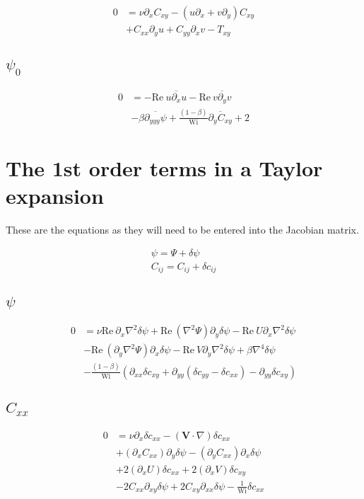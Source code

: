 \documentclass[12,a4paper]{article}
\newcommand{\dd}[1]{\partial_{#1}}
\newcommand{\lpl}{\nabla^{2}}
\newcommand{\bih}{\nabla^{4}}
\newcommand{\scij}{\delta c_{ij}}
\newcommand{\scxx}{\delta c_{xx}}
\newcommand{\scyy}{\delta c_{yy}}
\newcommand{\scxy}{\delta c_{xy}}
\newcommand{\spsi}{\delta \psi}
\newcommand{\Wi}{\mathrm{Wi}}
\newcommand{\Rey}{\mathrm{Re \ }}
\begin{document}
\begin{align}
    0 &= \nu \dd{x} C_{xy} - (u\dd{x} + v\dd{y}) C_{xy} \nonumber\\
    &+ C_{xx} \dd{y}u + C_{yy}\dd{x}v - T_{xy}
\end{align}

\subsection{$\psi_{0}$}

\begin{align}
    0 &= - \Rey \overline{u\dd{x}u} - \Rey \overline{v\dd{y}v} \nonumber\\
    &- \beta \overline{\dd{yyy}\psi} + \frac{(1-\beta)}{\Wi}\overline{\dd{y}C_{xy}} + 2
\end{align}

\section{The 1st order terms in a Taylor expansion}

These are the equations as they will need to be entered into the Jacobian matrix.

\begin{align}
\psi = \Psi + \spsi \\
C_{ij} = C_{ij} +\scij
\end{align}

\subsection{$\psi$}

\begin{align}
    0 &= \nu\Rey\dd{x}\lpl\spsi +  \Rey (\lpl\Psi) \dd{y}\spsi - \Rey U \dd{x}\lpl \spsi \nonumber\\
    &- \Rey (\dd{y}\lpl \Psi) \dd{x} \spsi - \Rey V \dd{y} \lpl \spsi + \beta \bih \spsi \nonumber\\
    &- \frac{(1-\beta)}{\Wi} \left( \dd{xx} \scxy +\dd{yy} (\scyy -\scxx) - \dd{yy} \scxy \right)
\end{align}

\subsection{$C_{xx}$}

\begin{align}
    0 &= \nu \dd{x} \scxx - (\mathbf{V}\cdot \nabla) \scxx \nonumber \\
    &+ (\dd{x}C_{xx})\dd{y}\spsi - (\dd{y}C_{xx})\dd{x} \spsi \nonumber\\
    &+ 2(\dd{x} U) \scxx + 2(\dd{x} V) \scxy \nonumber\\
    &- 2C_{xx}\dd{xy} \spsi + 2C_{xy}\dd{xx}\spsi - \frac{1}{\Wi}\scxx
\end{align}
\end{document}
